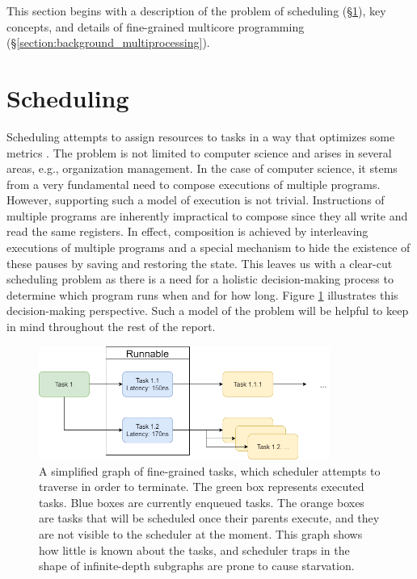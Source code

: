 \documentclass[12pt,a4paper,twoside]{report}
\begin{document}
This section begins with a description of the problem of scheduling (\S\ref{section:background_schedulers}), key concepts, and details of fine-grained multicore programming (\S\ref{section:background_multiprocessing}).

\section{Scheduling}
\label{section:background_schedulers}

Scheduling attempts to assign resources to tasks in a way that optimizes some metrics \cite{Pinedo2012}. The problem is not limited to computer science and arises in several areas, e.g., organization management. In the case of computer science, it stems from a very fundamental need to compose executions of multiple programs. However, supporting such a model of execution is not trivial. Instructions of multiple programs are inherently impractical to compose since they all write and read the same registers. In effect, composition is achieved by interleaving executions of multiple programs and a special mechanism to hide the existence of these pauses by saving and restoring the state. This leaves us with a clear-cut scheduling problem as there is a need for a holistic decision-making process to determine which program runs when and for how long. Figure \ref{fig:sched-graph} illustrates this decision-making perspective. Such a model of the problem will be helpful to keep in mind throughout the rest of the report. 

\begin{figure}
    \centering
    \includegraphics[width=0.85\textwidth]{scheduler_graph.png}
    \caption{A simplified graph of fine-grained tasks, which scheduler attempts to traverse in order to terminate. The green box represents executed tasks. Blue boxes are currently enqueued tasks. The orange boxes are tasks that will be scheduled once their parents execute, and they are not visible to the scheduler at the moment. This graph shows how little is known about the tasks, and scheduler traps in the shape of infinite-depth subgraphs are prone to cause starvation.}
   \label{fig:sched-graph}
\end{figure}
\end{document}
